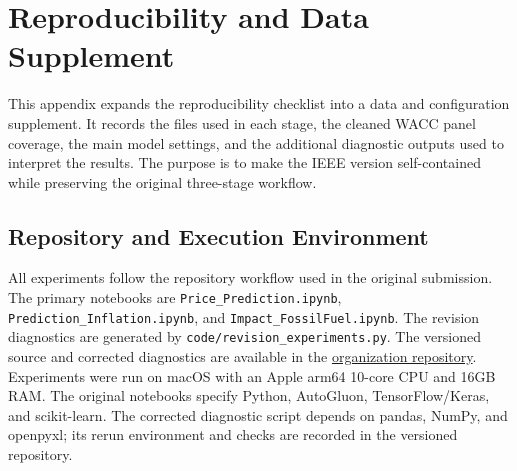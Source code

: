 \section{Reproducibility and Data Supplement}

This appendix expands the reproducibility checklist into a data and configuration supplement. It records the files used in each stage, the cleaned WACC panel coverage, the main model settings, and the additional diagnostic outputs used to interpret the results. The purpose is to make the IEEE version self-contained while preserving the original three-stage workflow.

\subsection{Repository and Execution Environment}

\begingroup\raggedright
All experiments follow the repository workflow used in the original submission. The primary notebooks are \texttt{Price\_Prediction.ipynb}, \texttt{Prediction\_Inflation.ipynb}, and \texttt{Impact\_FossilFuel.ipynb}. The revision diagnostics are generated by \texttt{code/revision\_experiments.py}. The versioned source and corrected diagnostics are available in the \href{https://github.com/GreenComp-ERC/ImpactOfFossilFeulPrice}{organization repository}. Experiments were run on macOS with an Apple arm64 10-core CPU and 16GB RAM. The original notebooks specify Python, AutoGluon, TensorFlow/Keras, and scikit-learn. The corrected diagnostic script depends on pandas, NumPy, and openpyxl; its rerun environment and checks are recorded in the versioned repository.\par\endgroup

